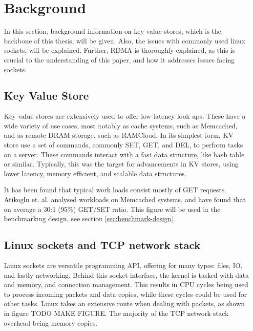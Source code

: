 
\chapter{Background}\label{ch:background} %



\ifpdf
    \graphicspath{{7/figures/PNG/}{7/figures/PDF/}{7/figures/}}
\else
    \graphicspath{{7/figures/EPS/}{7/figures/}}
\fi


%
%
In this section, background information on key value stores, which is the backbone of this thesis, will be given.
Also, the issues with commonly used linux sockets, will be explained.
Further, RDMA is thoroughly explained, as this is crucial to the understanding of this paper, and how it addresses issues facing sockets.

\section[KV-store]{Key Value Store}\label{sec:kv-store}
Key value stores are extensively used to offer low latency look ups.
These have a wide variety of use cases, most notably as cache systems, such as Memcached\cite{memcached}, and as remote DRAM storage, such as RAMCloud\cite{ousterhout2010case}.
In its simplest form, KV store use a set of commands, commonly SET, GET, and DEL, to perform tasks on a server.
These commands interact with a fast data structure, like hash table or similar.
Typically, this was the target for advancements in KV stores, using lower latency, memory efficient, and scalable data structures.

It has been found that typical work loads consist mostly of GET requests.
Atikoglu et. al. analysed workloads on Memcached systems, and have found that on average a 30:1 (95\%) GET/SET ratio\cite{atikoglu2012workload}.
This figure will be used in the benchmarking design, see section \ref{sec:benchmark-design}.

\section[Linux scokets and TCP]{Linux sockets and TCP network stack}\label{sec:linux-sockets}
Linux sockets are versatile programming API, offering for many types: files, IO, and lastly networking.
Behind this socket interface, the kernel is tasked with data and memory, and connection management.
This results in CPU cycles being used to process incoming packets and data copies, while these cycles could be used for other tasks.
Linux takes an extensive route when dealing with packets, as shown in figure TODO MAKE FIGURE.
The majority of the TCP network stack overhead being memory copies.

